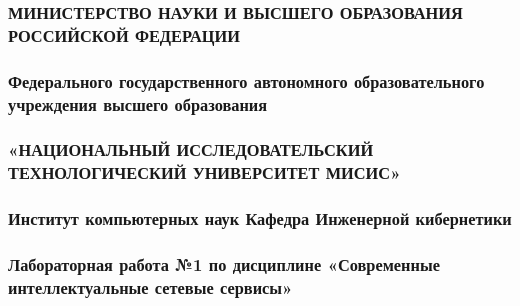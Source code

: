 \documentclass[
]{article}
\author{}
\date{}
\begin{document}
\subsubsection{МИНИСТЕРСТВО НАУКИ И ВЫСШЕГО ОБРАЗОВАНИЯ РОССИЙСКОЙ
ФЕДЕРАЦИИ}\label{ux43cux438ux43dux438ux441ux442ux435ux440ux441ux442ux432ux43e-ux43dux430ux443ux43aux438-ux438-ux432ux44bux441ux448ux435ux433ux43e-ux43eux431ux440ux430ux437ux43eux432ux430ux43dux438ux44f-ux440ux43eux441ux441ux438ux439ux441ux43aux43eux439-ux444ux435ux434ux435ux440ux430ux446ux438ux438}

\subsubsection{Федерального государственного автономного
образовательного учреждения высшего
образования}\label{ux444ux435ux434ux435ux440ux430ux43bux44cux43dux43eux433ux43e-ux433ux43eux441ux443ux434ux430ux440ux441ux442ux432ux435ux43dux43dux43eux433ux43e-ux430ux432ux442ux43eux43dux43eux43cux43dux43eux433ux43e-ux43eux431ux440ux430ux437ux43eux432ux430ux442ux435ux43bux44cux43dux43eux433ux43e-ux443ux447ux440ux435ux436ux434ux435ux43dux438ux44f-ux432ux44bux441ux448ux435ux433ux43e-ux43eux431ux440ux430ux437ux43eux432ux430ux43dux438ux44f}

\subsubsection{«НАЦИОНАЛЬНЫЙ ИССЛЕДОВАТЕЛЬСКИЙ ТЕХНОЛОГИЧЕСКИЙ
УНИВЕРСИТЕТ
МИСИС»}\label{ux43dux430ux446ux438ux43eux43dux430ux43bux44cux43dux44bux439-ux438ux441ux441ux43bux435ux434ux43eux432ux430ux442ux435ux43bux44cux441ux43aux438ux439-ux442ux435ux445ux43dux43eux43bux43eux433ux438ux447ux435ux441ux43aux438ux439-ux443ux43dux438ux432ux435ux440ux441ux438ux442ux435ux442-ux43cux438ux441ux438ux441}

\subsubsection{Институт компьютерных наук Кафедра Инженерной
кибернетики}\label{ux438ux43dux441ux442ux438ux442ux443ux442-ux43aux43eux43cux43fux44cux44eux442ux435ux440ux43dux44bux445-ux43dux430ux443ux43a-ux43aux430ux444ux435ux434ux440ux430-ux438ux43dux436ux435ux43dux435ux440ux43dux43eux439-ux43aux438ux431ux435ux440ux43dux435ux442ux438ux43aux438}

\subsubsection{Лабораторная работа №1 по дисциплине «Современные
интеллектуальные сетевые
сервисы»}\label{ux43bux430ux431ux43eux440ux430ux442ux43eux440ux43dux430ux44f-ux440ux430ux431ux43eux442ux430-1-ux43fux43e-ux434ux438ux441ux446ux438ux43fux43bux438ux43dux435-ux441ux43eux432ux440ux435ux43cux435ux43dux43dux44bux435-ux438ux43dux442ux435ux43bux43bux435ux43aux442ux443ux430ux43bux44cux43dux44bux435-ux441ux435ux442ux435ux432ux44bux435-ux441ux435ux440ux432ux438ux441ux44b}
\end{document}
